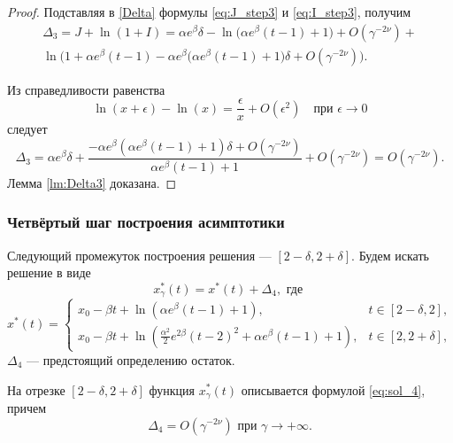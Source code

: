 \begin{proof}
Подставляя в \eqref{Delta} формулы \eqref{eq:J_step3}  и \eqref{eq:I_step3}, получим
\begin{multline}
	\label{eq:Delta_step3}
	\Delta_3=J+\ln(1+I)=\alpha e^{\beta}\delta-\ln\big(\alpha e^{\beta}(t-1)+1\big)+O(\gamma^{-2\nu})+\\ \ln\Big(1+\alpha e^{\beta}(t-1)-\alpha e^{\beta}\big(\alpha e^{\beta}(t-1)+1\big)\delta+O(\gamma^{-2\nu})\Big).
\end{multline}

Из справедливости равенства
%
\[\ln(x+\epsilon)-\ln(x) = \frac{\epsilon}{x} + O(\epsilon^2) \quad \text{при } \epsilon \to 0\]
%
следует
\[
\Delta_3 = \alpha e^{\beta}\delta + \frac{-\alpha e^{\beta}(\alpha e^{\beta}(t - 1) + 1)\delta + O(\gamma^{-2\nu})}{\alpha e^{\beta}(t-1)+1} + O(\gamma^{-2\nu}) = O(\gamma^{-2\nu}).
\]
Лемма \ref{lm:Delta3} доказана.
\end{proof}

\subsubsection{Четвёртый шаг построения асимптотики}

Следующий промежуток построения решения --- $[2 - \delta, 2 + \delta]$. Будем искать решение в виде
\begin{equation}
	\label{eq:sol_4}
	x_\gamma^*(t) = x^*(t) + \Delta_4, \text{ где } 
\end{equation}
\small
\begin{equation}
\label{eq:x_star_4_step}
x^*(t) = 
\begin{cases}
x_0 - \beta t + \ln(\alpha e^{\beta}(t - 1) + 1), & t \in [2 - \delta, 2],\\
x_0 -\beta t + \ln(\frac{\alpha^2}{2} e^{2\beta}(t - 2)^2 + \alpha e^{\beta}(t - 1) + 1), & t \in [2,2 + \delta],
\end{cases}
\end{equation}
\normalsize
$\Delta_4$ --- предстоящий определению остаток.

\begin{lemma}
\label{lem_Delta4}
На отрезке $[2 - \delta, 2 + \delta]$ функция $x_\gamma^*(t)$ описывается формулой \eqref{eq:sol_4}, причем
\[
	\Delta_4 = O(\gamma^{-2\nu}) \text{ при } \gamma \to +\infty.
\]
\end{lemma}

